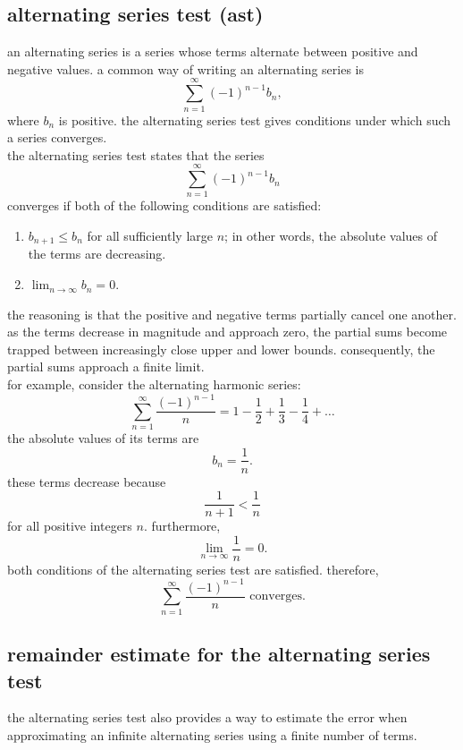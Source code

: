 \documentclass{article}
\begin{document}
\subsection{alternating series test (ast)}

an alternating series is a series whose terms alternate between positive and negative values. a common way of writing an alternating series is
\[
\sum_{n=1}^{\infty}(-1)^{n-1}b_n,
\]
where $b_n$ is positive. the alternating series test gives conditions under which such a series converges.\\

the alternating series test states that the series
\[
\sum_{n=1}^{\infty}(-1)^{n-1}b_n
\]
converges if both of the following conditions are satisfied:

\begin{enumerate}
    \item $b_{n+1}\leq b_n$ for all sufficiently large $n$; in other words, the absolute values of the terms are decreasing.
    \item $\displaystyle\lim_{n\to\infty}b_n=0$.
\end{enumerate}

the reasoning is that the positive and negative terms partially cancel one another. as the terms decrease in magnitude and approach zero, the partial sums become trapped between increasingly close upper and lower bounds. consequently, the partial sums approach a finite limit.\\

for example, consider the alternating harmonic series:
\[
\sum_{n=1}^{\infty}\frac{(-1)^{n-1}}{n}
=
1-\frac{1}{2}+\frac{1}{3}-\frac{1}{4}+\ldots
\]
the absolute values of its terms are
\[
b_n=\frac{1}{n}.
\]
these terms decrease because
\[
\frac{1}{n+1}<\frac{1}{n}
\]
for all positive integers $n$. furthermore,
\[
\lim_{n\to\infty}\frac{1}{n}=0.
\]
both conditions of the alternating series test are satisfied. therefore,
\[
\boxed{
\sum_{n=1}^{\infty}\frac{(-1)^{n-1}}{n}
\text{ converges.}
}
\]

\subsection{remainder estimate for the alternating series test}

the alternating series test also provides a way to estimate the error when approximating an infinite alternating series using a finite number of terms.\\
\end{document}
